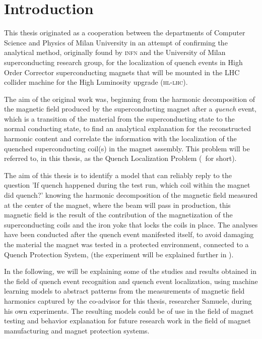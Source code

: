 \chapter{Introduction}
This thesis originated as a cooperation between the departments of Computer Science and Physics of
Milan University in an attempt of confirming the analytical method, originally found by
\textsc{infn} and the University of Milan superconducting research group, for the localization of
quench events in High Order Corrector superconducting magnets \cite{mariotto2022,
	mariotto2022-generic} that will be mounted in the LHC collider machine for the High
Luminosity upgrade \cite{rossi2024} (\textsc{hl-lhc}).

The aim of the original work was, beginning from the harmonic decomposition of the magnetic
field produced by the superconducting magnet after a \emph{quench} event, which is a transition of the
material from the superconducting state to the normal conducting state, to find an analytical
explanation for the reconstructed harmonic content and correlate the information with the
localization of the quenched superconducting coil(s) in the magnet assembly. This problem will be
referred to, in this thesis, as the Quench Localization Problem (\qlp\ for short).

The aim of this thesis is to identify a model that can reliably reply to the question 'If quench
happened during the test run, which coil within the magnet did quench?' knowing the harmonic
decomposition of the magnetic field measured at the center of the magnet, where the beam will pass
in production, this magnetic field is the result of the contribution of the magnetization of the
superconducting coils and the iron yoke that locks the coils in place. The analyses have been
conducted after the quench event manifested itself, to avoid damaging the material the magnet was
tested in a protected environment, connected to a Quench Protection System, (the experiment will be
explained further in ).

In the following, we will be explaining some of the studies and results obtained in the field of
quench event recognition and quench event localization, using machine learning models to abstract
patterns from the measurements of magnetic field harmonics captured by the co-advisor for this
thesis, researcher Samuele, during his own experiments. The resulting models could be of use in the
field of magnet testing and behavior explanation for future research work in the field of magnet
manufacturing and magnet protection systems.

